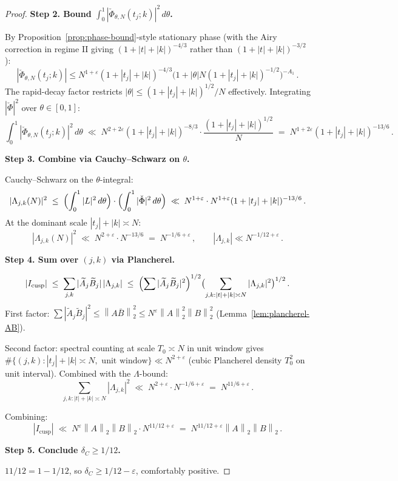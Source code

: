 \documentclass[11pt]{article}
\theoremstyle{definition}
\newcommand{\norm}[1]{\left\lVert #1\right\rVert}
\begin{document}
\begin{proof}
\textbf{Step 2. Bound $\int_0^1|\check\Phi_{\theta,N}(t_j;k)|^2\,d\theta$.}

By Proposition~\ref{prop:phase-bound}-style stationary phase (with the Airy correction in regime II giving $(1+|t|+|k|)^{-4/3}$ rather than $(1+|t|+|k|)^{-3/2}$):
\[
   |\check\Phi_{\theta,N}(t_j;k)|\le N^{1+\varepsilon}(1+|t_j|+|k|)^{-4/3}\bigl(1+|\theta|N(1+|t_j|+|k|)^{-1/2}\bigr)^{-A_1}\,.
\]
The rapid-decay factor restricts $|\theta|\le(1+|t_j|+|k|)^{1/2}/N$ effectively. Integrating $|\check\Phi|^2$ over $\theta\in[0,1]$:
\[
   \int_0^1|\check\Phi_{\theta,N}(t_j;k)|^2\,d\theta\;\ll\;N^{2+2\varepsilon}(1+|t_j|+|k|)^{-8/3}\cdot\frac{(1+|t_j|+|k|)^{1/2}}{N}\;=\;N^{1+2\varepsilon}(1+|t_j|+|k|)^{-13/6}\,.
\]

\textbf{Step 3. Combine via Cauchy--Schwarz on $\theta$.}

Cauchy--Schwarz on the $\theta$-integral:
\[
   |\Lambda_{j,k}(N)|^2\;\le\;\Bigl(\int_0^1|L|^2\,d\theta\Bigr)\cdot\Bigl(\int_0^1|\check\Phi|^2\,d\theta\Bigr)\;\ll\;N^{1+\varepsilon}\cdot N^{1+\varepsilon}(1+|t_j|+|k|)^{-13/6}\,.
\]
At the dominant scale $|t_j|+|k|\asymp N$:
\[
   |\Lambda_{j,k}(N)|^2\;\ll\;N^{2+\varepsilon}\cdot N^{-13/6}\;=\;N^{-1/6+\varepsilon}\,,\qquad|\Lambda_{j,k}|\ll N^{-1/12+\varepsilon}\,.
\]

\textbf{Step 4. Sum over $(j,k)$ via Plancherel.}

\[
   |I_{\mathrm{cusp}}|\;\le\;\sum_{j,k}|\widetilde A_j\widetilde B_j|\,|\Lambda_{j,k}|\;\le\;\Bigl(\sum|\widetilde A_j\widetilde B_j|^2\Bigr)^{1/2}\bigl(\sum_{j,k:|t|+|k|\asymp N}|\Lambda_{j,k}|^2\bigr)^{1/2}\,.
\]
First factor: $\sum|\widetilde A_j\widetilde B_j|^2\le\norm{A\bar B}_2^2\le N^\varepsilon\norm A_2^2\norm B_2^2$ (Lemma~\ref{lem:plancherel-AB}).

Second factor: spectral counting at scale $T_0\asymp N$ in unit window gives $\#\{(j,k):|t_j|+|k|\asymp N,\text{ unit window}\}\ll N^{2+\varepsilon}$ (cubic Plancherel density $T_0^2$ on unit interval). Combined with the $\Lambda$-bound:
\[
   \sum_{j,k:|t|+|k|\asymp N}|\Lambda_{j,k}|^2\;\ll\;N^{2+\varepsilon}\cdot N^{-1/6+\varepsilon}\;=\;N^{11/6+\varepsilon}\,.
\]

Combining:
\[
   |I_{\mathrm{cusp}}|\;\ll\;N^\varepsilon\norm A_2\norm B_2\cdot N^{11/12+\varepsilon}\;=\;N^{11/12+\varepsilon}\norm A_2\norm B_2\,.
\]

\textbf{Step 5. Conclude $\delta_C\ge 1/12$.}

$11/12=1-1/12$, so $\delta_C\ge 1/12-\varepsilon$, comfortably positive.


\end{proof}
\end{document}
